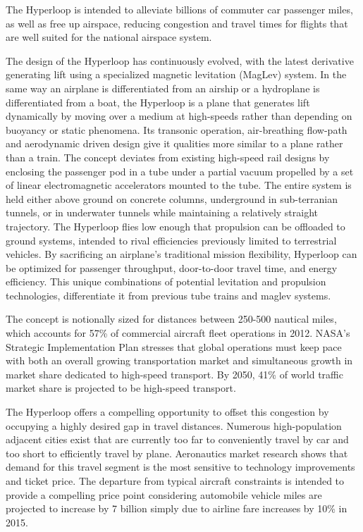 	The Hyperloop is intended to alleviate billions of commuter car passenger miles,
	as well as free up airspace, reducing congestion and travel times for
	flights that are well suited for the national airspace system.

	The design of the Hyperloop has continuously evolved, with the latest derivative
	generating lift using a specialized magnetic levitation (MagLev) system.
	In the same way an airplane is differentiated from an airship or a hydroplane is differentiated from
	a boat, the Hyperloop is a plane that generates lift dynamically
	by moving over a medium at high-speeds
	rather than depending on buoyancy or static phenomena.
	Its transonic operation, air-breathing flow-path and aerodynamic
	driven design give it qualities more similar to a plane rather than a train.
	The concept deviates from existing high-speed rail designs by enclosing the passenger pod in a tube under a partial vacuum
	propelled by a set of linear electromagnetic accelerators
	mounted to the tube. The entire system is held either above ground on concrete
	columns, underground in sub-terranian tunnels, or in underwater tunnels while maintaining a relatively straight trajectory.
	The Hyperloop flies low enough that propulsion can be offloaded to ground systems,
	intended to rival efficiencies previously limited to terrestrial vehicles.
	By sacrificing an airplane's traditional mission flexibility,
	Hyperloop can be optimized for passenger throughput, door-to-door travel time,
	and energy efficiency.
	This unique combinations of potential levitation and propulsion technologies,
	differentiate it from previous tube trains and maglev systems.

	The concept is notionally sized for distances between 250-500 nautical miles,
	which accounts for 57\% of commercial aircraft fleet operations in 2012. NASA's
	Strategic Implementation Plan stresses that global operations must keep pace with both an overall growing
	transportation market and simultaneous growth in market share dedicated to high-speed transport.
	By 2050, 41\% of world traffic market share is projected to be high-speed transport. \cite{Schafer}

	The Hyperloop offers a compelling opportunity to offset this congestion
	by occupying a highly desired gap in travel distances.
	Numerous high-population adjacent cities exist that are currently
	too far to conveniently travel by car and too short to efficiently travel by plane.
	Aeronautics market research shows that demand for this travel segment is
	the most sensitive to technology improvements and ticket price.\cite{H. Baik}
	The departure from typical aircraft constraints is intended to provide a
	compelling price point considering automobile vehicle miles are
	projected to increase by 7 billion simply due to airline
	fare increases by 10\% in 2015.

